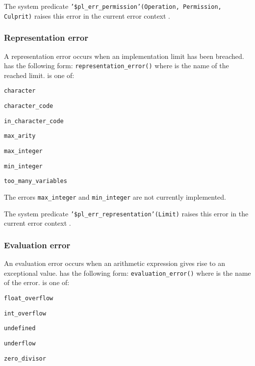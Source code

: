 The system predicate \texttt{'\$pl\_err\_permission'(Operation, Permission,
Culprit)} raises this error in the current error context .

\subsubsection{Representation error}
\label{Representation-error}
A representation error occurs when an implementation limit has been
breached.  has the following form:
\texttt{representation\_error()} where 
is the name of the reached limit.  is one of:

\begin{ItemizeThreeCols}

\item \texttt{character}

\item \texttt{character\_code}

\item \texttt{in\_character\_code}

\item \texttt{max\_arity}

\item \texttt{max\_integer}

\item \texttt{min\_integer}

\item \texttt{too\_many\_variables}

\end{ItemizeThreeCols}

The errors \texttt{max\_integer} and \texttt{min\_integer} are not currently
implemented.

The system predicate \texttt{'\$pl\_err\_representation'(Limit)} raises this
error in the current error context .

\subsubsection{Evaluation error}
\label{Evaluation-error}
An evaluation error occurs when an arithmetic expression gives rise to
an exceptional value.  has the following form:
\texttt{evaluation\_error()} where  is
the name of the error.  is one of:

\begin{ItemizeThreeCols}

\item \texttt{float\_overflow}

\item \texttt{int\_overflow}

\item \texttt{undefined}

\item \texttt{underflow}

\item \texttt{zero\_divisor}

\end{ItemizeThreeCols}

